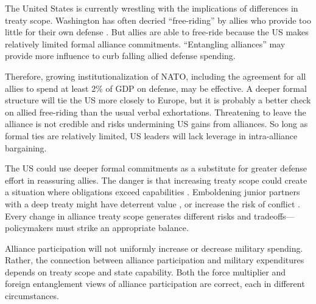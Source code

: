 \documentclass[12pt]{article}
\begin{document}
The United States is currently wrestling with the implications of differences in treaty scope. 
Washington has often decried ``free-riding'' by allies who provide too little for their own defense \citep{Lanoszka2015}. 
But allies are able to free-ride because the US makes relatively limited formal alliance commitments. 
``Entangling alliances'' may provide more influence to curb falling allied defense spending. 

 
Therefore, growing institutionalization of NATO, including the agreement for all allies to spend at least 2\% of GDP on defense, may be effective.
A deeper formal structure will tie the US more closely to Europe, but it is probably a better check on allied free-riding than the usual verbal exhortations. 
Threatening to leave the alliance is not credible and risks undermining US gains from alliances. 
So long as formal ties are relatively limited, US leaders will lack leverage in intra-alliance bargaining. 


The US could use deeper formal commitments as a substitute for greater defense effort in reassuring allies.
The danger is that increasing treaty scope could create a situation where obligations exceed capabilities \citep{Kennedy1987}. 
Emboldening junior partners with a deep treaty might have deterrent value \citep{Bensonetal2014}, or increase the risk of conflict \citep{Benson2012}.
Every change in alliance treaty scope generates different risks and tradeoffs--- policymakers must strike an appropriate balance. 
 

Alliance participation will not uniformly increase or decrease military spending. 
Rather, the connection between alliance participation and military expenditures depends on treaty scope and state capability.  
Both the force multiplier and foreign entanglement views of alliance participation are correct, each in different circumstances. 




\singlespace
 
 
\end{document}
